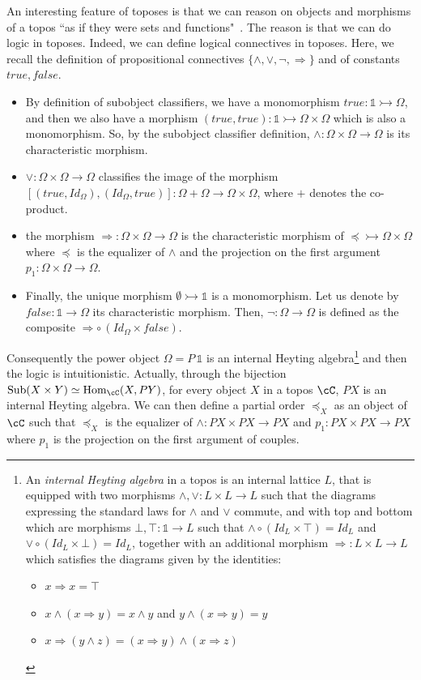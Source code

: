 \documentclass[preprint,3p,times]{elsarticle}
\newcommand{\Sub}{\mathrm{Sub}}
\newcommand{\Hom}{\mathrm{Hom}}
\begin{document}
An interesting feature of toposes
is that we can reason on objects and morphisms of a topos ``as if they were sets and functions"~\cite{Johnstone02,Law72}. The reason is that we can do logic in toposes. Indeed, we can define logical connectives in toposes. Here, we recall the definition of propositional connectives 
$\{\wedge,\vee,\neg,\Rightarrow\}$ and of constants $true, false$. %
\begin{itemize}
    \item By definition of subobject classifiers, we have a monomorphism $true : \mathbb{1} \rightarrowtail \Omega$, and then we also have a morphism $(true,true) : \mathbb{1} \rightarrowtail \Omega \times \Omega$ which is also a monomorphism. So, by the subobject classifier definition, $\wedge : \Omega \times \Omega \to \Omega$ is its characteristic morphism. 
    \item {$\vee : \Omega \times \Omega \to \Omega$ classifies the image of the morphism $[(true,Id_\Omega),(Id_\Omega,true)] : \Omega +\Omega \to \Omega \times \Omega$,} {where $+$ denotes the co-product.}
    \item the morphism $\Rightarrow : \Omega \times \Omega \to \Omega$ is the characteristic morphism of $\preceq \rightarrowtail \Omega \times \Omega$ where $\preceq$ is the equalizer of $\wedge$ and the projection on the first argument $p_1 : \Omega \times \Omega \to \Omega$. 
    \item Finally, the unique morphism $\emptyset \rightarrowtail \mathbb{1}$ is a monomorphism. Let us denote by $false : \mathbb{1} \to \Omega$ its characteristic morphism. Then, $\neg : \Omega \to \Omega$ is defined as the composite $\Rightarrow \circ \, (Id_\Omega \times false)$. 
\end{itemize}
Consequently the power object $\Omega = P\, \mathbb{1}$ is an internal Heyting algebra\footnote{An {\em internal Heyting algebra} in a topos is an internal lattice $L$, that is equipped with two morphisms $\wedge,\vee : L \times L \to L$ such that the diagrams expressing the standard laws for $\wedge$ and $\vee$ commute, and with top and bottom which are morphisms $\bot,\top: \mathbb{1} \to L$ such that $\wedge\circ (Id_L \times \top) = Id_L$ and $\vee \circ (Id_L \times \bot) = Id_L$, together with an additional morphism $\Rightarrow : L \times L \to L$ which satisfies the diagrams given by the
identities:
\begin{itemize}
    \item $x \Rightarrow x = \top$
    \item $x \wedge (x \Rightarrow y) = x \wedge y$ and $y \wedge (x \Rightarrow y) = y$
    \item $x \Rightarrow (y \wedge z) = (x \Rightarrow y) \wedge (x \Rightarrow z)$
\end{itemize}
}
and then the logic is intuitionistic. Actually, through the bijection $\Sub(X \times Y) \simeq \Hom_\cC(X,PY)$, for every object $X$ in a topos $\cC$, $PX$ is an internal Heyting algebra. We can then define a partial order $\preceq_X$ 
as an object of $\cC$ such that $\preceq_X$ is the equalizer of $\wedge : PX \times PX \to PX$ and $p_1 : PX \times PX \to PX$ where $p_1$ is the projection on the first argument of couples. %
\end{document}
